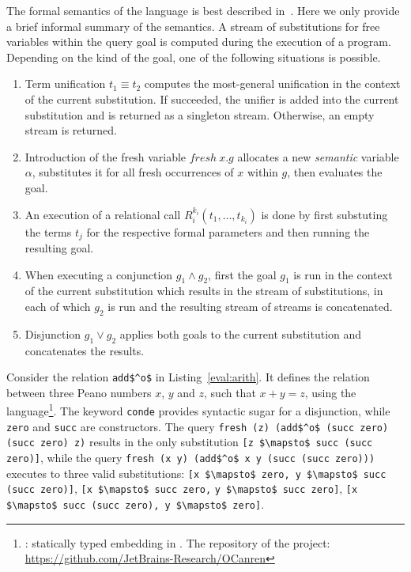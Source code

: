 The formal semantics of the language is best described in~\cite{rozplokhas2020certified}.
Here we only provide a brief informal summary of the semantics.
A stream of substitutions for free variables within the query goal is computed during the execution of a \mk program.
Depending on the kind of the goal, one of the following situations is possible.

\begin{enumerate}
  \item Term unification $t_1 \equiv t_2$ computes the most-general unification in the context of the current substitution. If succeeded, the unifier is added into the current substitution and is returned as a singleton stream. Otherwise, an empty stream is returned.
  \item Introduction of the fresh variable $fresh \ x. g$ allocates a new \emph{semantic} variable $\alpha$, substitutes it for all fresh occurrences of $x$ within $g$, then evaluates the goal.
  \item An execution of a relational call $R^{k_i}_i(t_1, \dots, t_{k_i})$ is done by first substuting the terms $t_j$ for the respective formal parameters and then running the resulting goal.
  \item When executing a conjunction $g_1 \wedge g_2$, first the goal $g_1$ is run in the context of the current substitution which results in the stream of substitutions, in each of which $g_2$ is run and the resulting stream of streams is concatenated.
  \item Disjunction $g_1 \vee g_2$ applies both goals to the current substitution and concatenates the results.
\end{enumerate}

Consider the relation \lstinline{add$^o$} in Listing~\ref{eval:arith}.
It defines the relation between three Peano numbers $x$, $y$ and $z$, such that $x + y = z$, using the \oc language\footnote{\oc: statically typed \mk embedding in \ocaml. The repository of the project: \url{https://github.com/JetBrains-Research/OCanren}}.
The keyword \lstinline{conde} provides syntactic sugar for a disjunction, while \lstinline{zero} and \lstinline{succ} are constructors.
The query \lstinline{fresh (z) (add$^o$ (succ zero) (succ zero) z)} results in the only substitution \lstinline{[z $\mapsto$ succ (succ zero)]}, while the query \lstinline{fresh (x y) (add$^o$ x y (succ (succ zero)))} executes to three valid substitutions: \lstinline{[x $\mapsto$ zero, y $\mapsto$ succ (succ zero)]}, \lstinline{[x $\mapsto$ succ zero,} \lstinline{y $\mapsto$ succ zero]}, \lstinline{[x $\mapsto$ succ (succ zero), y $\mapsto$ zero]}.

